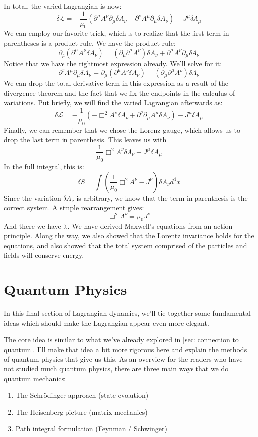 In total, the varied \gls{Lagrangian} is now:
$$\delta\mathcal{L}=-\frac{1}{\mu_0}(\partial^\mu A^\nu\partial_\mu \delta A_\nu-\partial^\nu A^\mu\partial_\mu \delta A_\nu)-J^\mu\delta A_\mu$$
We can employ our favorite trick, which is to realize that the first term in parentheses is a product rule. We have the product rule:
$$\partial_\mu(\partial^\mu A^\nu \delta A_\nu)=(\partial_\mu\partial^\mu A^\nu)\delta A_\nu+\partial^\mu A^\nu\partial_\mu\delta A_\nu$$
Notice that we have the rightmost expression already. We'll solve for it:
$$\partial^\nu A^\mu\partial_\mu\delta A_\nu=\partial_\mu(\partial^\mu A^\nu \delta A_\nu) - (\partial_\mu\partial^\mu A^\nu)\delta A_\nu$$
We can drop the total derivative term in this expression as a result of the divergence theorem and the fact that we fix the endpoints in the calculus of variations. Put briefly, we will find the varied \gls{Lagrangian} afterwards as:
$$\delta\mathcal{L}=-\frac{1}{\mu_0}(-\Box^2 A^\nu  \delta A_\nu +\partial^\nu \partial_\mu A^\mu \delta A_\nu)-J^\mu\delta A_\mu$$
Finally, we can remember that we chose the Lorenz gauge, which allows us to drop the last term in parenthesis. This leaves us with
$$\frac{1}{\mu_0}\Box^2 A^\nu  \delta A_\nu -J^\mu\delta A_\mu$$
In the full integral, this is:
$$\delta S = \int\left(\frac{1}{\mu_0}\Box^2 A^\nu -J^\nu\right)\delta A_\nu d^4x$$
Since the variation $\delta A_\nu$  is arbitrary, we know that the term in parenthesis is the correct system. A simple rearrangement gives:
$$\Box^2 A^\nu =\mu_0J^\nu$$
And there we have it. We have derived Maxwell's equations from an action principle. Along the way, we also showed that the Lorentz invariance holds for the equations, and also showed that the total system comprised of the particles and fields will conserve energy. 

\section{Quantum Physics}
In this final section of Lagrangian dynamics, we'll tie together some fundamental ideas which should make the Lagrangian appear even more elegant.

The core idea is similar to what we've already explored in \autoref{sec: connection to quantum}. I'll make that idea a bit more rigorous here and explain the methods of quantum physics that give us this. As an overview for the readers who have not studied much quantum physics, there are three main ways that we do quantum mechanics:
\begin{enumerate}
    \item The Schr\"odinger approach (state evolution)
    \item The Heisenberg picture (matrix mechanics)
    \item Path integral formulation (Feynman / Schwinger)
\end{enumerate}

